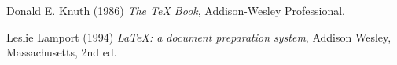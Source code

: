 \documentclass[12pt, letter paper]{report}
\begin{document}
\begin{thebibliography}{7}
Donald E. Knuth (1986) \emph{The \TeX{} Book}, Addison-Wesley Professional.

Leslie Lamport (1994) \emph{\LaTeX: a document preparation system}, Addison
Wesley, Massachusetts, 2nd ed.
\end{thebibliography}
\end{document}
